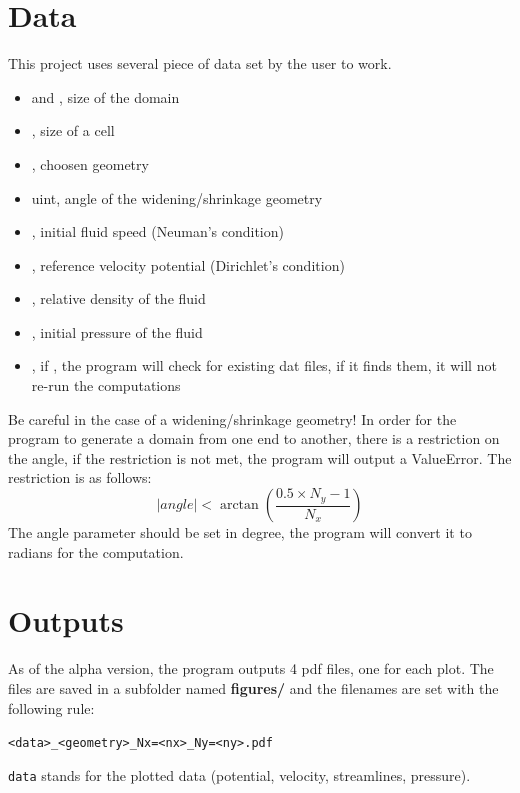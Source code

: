 \section{Data}
This project uses several piece of data set by the user to work.
\begin{itemize}
      \item {} \textcolor{dtype}{} and
             \textcolor{dtype}{}, size of the domain
      \item {} \textcolor{dtype}{}, size of a cell
      \item {}, choosen geometry
      \item {} \textcolor{dtype}{uint}, angle of the
            widening/shrinkage geometry
      \item {}, initial fluid speed (Neuman's condition)
      \item {}, reference velocity potential (Dirichlet's
            condition)
      \item {}, relative density of the fluid
      \item {}, initial pressure of the fluid
      \item {}, if , the program will check for
      existing dat files, if it finds them, it will not re-run the computations
\end{itemize}
Be careful in the case of a widening/shrinkage geometry!
In order for the program to generate a domain from one end to another, there is
a restriction on the angle, if the restriction is not met, the program will
output a ValueError. The restriction is as follows:
\[
      |angle| < \arctan{\left(\dfrac{0.5 \times N_y - 1}{N_x}\right)}
\]
The angle parameter should be set in degree, the program will convert it to
radians for the computation.

\section{Outputs}
As of the alpha version, the program outputs 4 pdf files, one for each plot.
The files are saved in a subfolder named \textbf{figures/} and the filenames
are set with the following rule:

\begin{center}
      \texttt{<data>_<geometry>_Nx=<nx>_Ny=<ny>.pdf}
\end{center}
\texttt{data} stands for the plotted data (potential, velocity,
streamlines, pressure).

